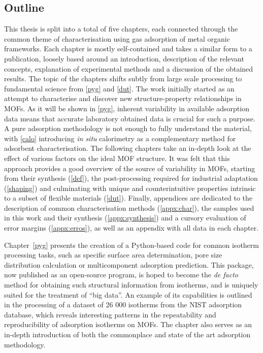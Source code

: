 \subsection*{Outline}

This thesis is split into a total of five chapters, each
connected through the common theme of characterisation 
using gas adsorption of metal organic frameworks. 
Each chapter is mostly 
self-contained and takes a similar form to a publication,
loosely based around an introduction, description of the 
relevant concepts, explanation of experimental methods and
a discussion of the obtained results. 
The topic of the chapters 
shifts subtly from large scale processing to fundamental
science from \autoref{pyg} and \autoref{dut}.
The work initially started as an attempt to characterise and
discover new structure-property relationships in \glspl{MOF}.
As it will be shown in \autoref{pyg}, inherent variability
in available adsorption data means that accurate laboratory
obtained data is crucial for such a purpose. A pure adsorption
methodology is not enough to fully understand the material,
with \autoref{calo} introducing \textit{in situ} calorimetry
as a complementary method for adsorbent characterisation.
The following chapters take an in-depth look at the effect of 
various factors on the ideal \gls{MOF} structure.
It was felt that this approach provides a good overview of the source of 
variability in \glspl{MOF}, starting from their synthesis
(\autoref{def}), the post-processing required for industrial
adaptation (\autoref{shaping}) and culminating with 
unique and counterintuitive properties intrinsic to a subset 
of flexible materials (\autoref{dut}). Finally, appendices are 
dedicated to the description of common characterisation methods
(\autoref{appx:char}), the samples used in this work and their 
synthesis (\autoref{appx:synthesis}) and a cursory evaluation of 
error margins (\autoref{appx:erros}), as well as an appendix with 
all data in each chapter.

Chapter~\ref{pyg} presents the creation of a Python-based code for
common isotherm processing tasks, such as specific surface area 
determination, pore size distribution calculation or multicomponent 
adsorption prediction. This package, now published as an 
open-source program, is hoped to become the \textit{de facto}
method for obtaining such structural information from isotherms,
and is uniquely suited for the treatment of ``big data''.
An example of its capabilities is outlined in the processing of 
a dataset of 26 000 isotherms from the \gls{NIST} adsorption database,
which reveals interesting patterns in the repeatability and reproducibility
of adsorption isotherms on \glspl{MOF}. The chapter also serves as
an in-depth introduction of both the commonplace and state of the art adsorption methodology.

